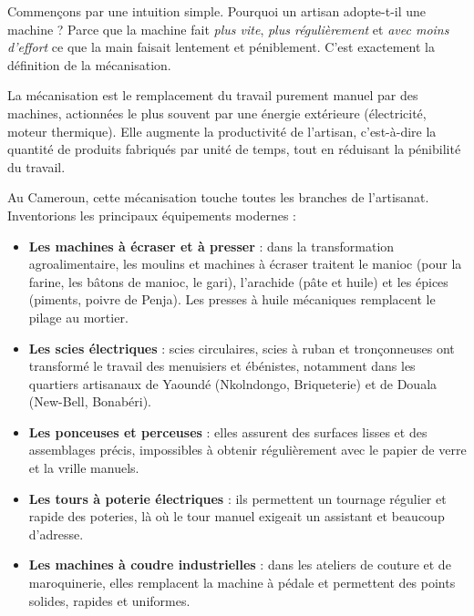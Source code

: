\documentclass[11pt]{article}
\newcommand{\cle}[1]{{\popxbold\color{popdark}#1}}
\begin{document}
Commençons par une intuition simple. Pourquoi un artisan adopte-t-il une machine ? Parce que la machine fait \emph{plus vite}, \emph{plus régulièrement} et \emph{avec moins d'effort} ce que la main faisait lentement et péniblement. C'est exactement la définition de la mécanisation.

\begin{definition}[Mécanisation]
La \cle{mécanisation} est le remplacement du travail purement manuel par des machines, actionnées le plus souvent par une énergie extérieure (électricité, moteur thermique). Elle augmente la \cle{productivité} de l'artisan, c'est-à-dire la quantité de produits fabriqués par unité de temps, tout en réduisant la pénibilité du travail.
\end{definition}

Au Cameroun, cette mécanisation touche toutes les branches de l'artisanat. Inventorions les principaux équipements modernes :

\begin{itemize}
\item \textbf{Les machines à écraser et à presser} : dans la transformation agroalimentaire, les moulins et machines à écraser traitent le manioc (pour la farine, les bâtons de manioc, le gari), l'arachide (pâte et huile) et les épices (piments, poivre de Penja). Les presses à huile mécaniques remplacent le pilage au mortier.
\item \textbf{Les scies électriques} : scies circulaires, scies à ruban et tronçonneuses ont transformé le travail des menuisiers et ébénistes, notamment dans les quartiers artisanaux de Yaoundé (Nkolndongo, Briqueterie) et de Douala (New-Bell, Bonabéri).
\item \textbf{Les ponceuses et perceuses} : elles assurent des surfaces lisses et des assemblages précis, impossibles à obtenir régulièrement avec le papier de verre et la vrille manuels.
\item \textbf{Les tours à poterie électriques} : ils permettent un tournage régulier et rapide des poteries, là où le tour manuel exigeait un assistant et beaucoup d'adresse.
\item \textbf{Les machines à coudre industrielles} : dans les ateliers de couture et de maroquinerie, elles remplacent la machine à pédale et permettent des points solides, rapides et uniformes.
\end{itemize}
\end{document}
